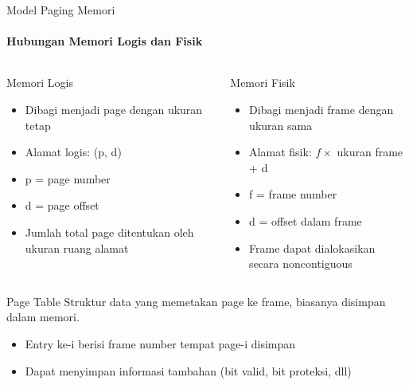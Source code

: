 \documentclass[10pt,aspectratio=169]{beamer}
\begin{document}
\begin{frame}{Model Paging Memori}
    \framesubtitle{Hubungan Memori Logis dan Fisik}
    
    \begin{columns}[T]
            \begin{block}{Memori Logis}
                \begin{itemize}
                    \item Dibagi menjadi page dengan ukuran tetap
                    \item Alamat logis: (p, d)
                    \item p = page number
                    \item d = page offset
                    \item Jumlah total page ditentukan oleh ukuran ruang alamat
                \end{itemize}
            \end{block}
            
                \begin{block}{Memori Fisik}
                \begin{itemize}
                    \item Dibagi menjadi frame dengan ukuran sama
                    \item Alamat fisik: $f \times$ ukuran frame + d
                    \item f = frame number
                    \item d = offset dalam frame
                    \item Frame dapat dialokasikan secara noncontiguous
                \end{itemize}
            \end{block}
    \end{columns}
    
    \begin{alertblock}{Page Table}
        Struktur data yang memetakan page ke frame, biasanya disimpan dalam memori.
        \begin{itemize}
            \item Entry ke-i berisi frame number tempat page-i disimpan
            \item Dapat menyimpan informasi tambahan (bit valid, bit proteksi, dll)
        \end{itemize}
    \end{alertblock}
\end{frame}
\end{document}
